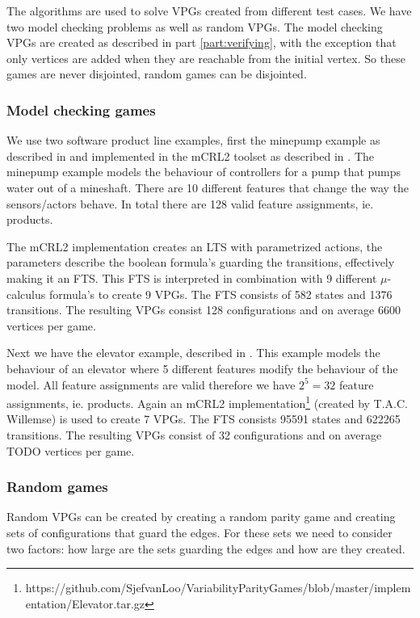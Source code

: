 The algorithms are used to solve VPGs created from different test cases. We have two model checking problems as well as random VPGs. The model checking VPGs are created as described in part \ref{part:verifying}, with the exception that only vertices are added when they are reachable from the initial vertex. So these games are never disjointed, random games can be disjointed.

\subsubsection{Model checking games}
We use two software product line examples, first the minepump example as described in \cite{Kramer1983CONICAI} and implemented in the mCRL2 toolset as described in \cite{FamBasedModelCheckingWithMCRL2}. The minepump example models the behaviour of controllers for a pump that pumps water out of a mineshaft. There are 10 different features that change the way the sensors/actors behave. In total there are 128 valid feature assignments, ie. products. 

The mCRL2 implementation creates an LTS with parametrized actions, the parameters describe the boolean formula's guarding the transitions, effectively making it an FTS. This FTS is interpreted in combination with 9 different $\mu$-calculus formula's to create 9 VPGs. The FTS consists of 582 states and 1376 transitions. The resulting VPGs consist 128 configurations and on average 6600 vertices per game.

Next we have the elevator example, described in \cite{PLATH200153}. This example models the behaviour of an elevator where 5 different features modify the behaviour of the model. All feature assignments are valid therefore we have $2^5 = 32$ feature assignments, ie. products. Again an mCRL2 implementation\footnote{\label{note1}https://github.com/SjefvanLoo/VariabilityParityGames/blob/master/implementation/Elevator.tar.gz} (created by T.A.C. Willemse) is used to create 7 VPGs. The FTS consists 95591 states and 622265 transitions. The resulting VPGs consist of 32 configurations and on average TODO vertices per game. 
\subsubsection{Random games}
Random VPGs can be created by creating a random parity game and creating sets of configurations that guard the edges. For these sets we need to consider two factors: how large are the sets guarding the edges and how are they created.


